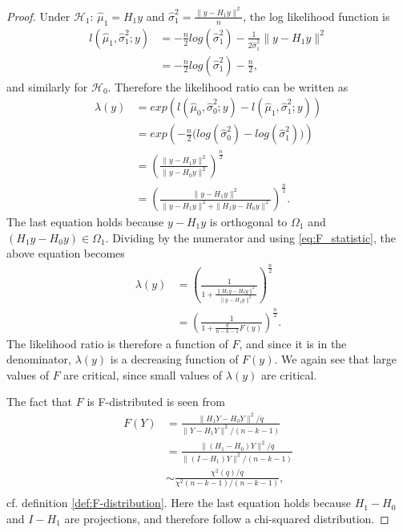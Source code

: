 \begin{proof}
    Under $\mathcal{H}_1$: $\hat{\mu}_1 = H_1 y$ and $\hat{\sigma}_1^2 = \frac{\| y - H_1 y \|^2}{n}$, the log likelihood function is
    \begin{align*}
        l(\hat{\mu}_1, \hat{\sigma}_1^2; y) &= -\frac{n}{2} log(\hat{\sigma}_1^2) - \frac{1}{2 \hat{\sigma}_1^2} \| y - H_1 y \|^2 \\
        &= -\frac{n}{2} log(\hat{\sigma}_1^2) - \frac{n}{2},
    \end{align*}
    and similarly for $\mathcal{H}_0$. Therefore the likelihood ratio can be written as
    \begin{align*}
        \lambda(y) &= exp \left( l(\hat{\mu}_0, \hat{\sigma}_0^2; y) - l(\hat{\mu}_1, \hat{\sigma}_1^2; y) \right) \\
        &= exp \left( -\frac{n}{2} \Big( log(\hat{\sigma}_0^2) - log(\hat{\sigma}_1^2)\Big) \right) \\
        &= \left( \frac{\| y - H_1 y \|^2}{\| y - H_0 y \|^2} \right)^{\frac{n}{2}} \\
        &= \left( \frac{\| y - H_1 y \|^2}{\| y - H_1 y \|^2 + \| H_1 y - H_0 y \|^2} \right)^{\frac{n}{2}}.
    \end{align*}
    The last equation holds because $y - H_1 y$ is orthogonal to $\Omega_1$ and $(H_1 y - H_0 y) \in \Omega_1$. Dividing by the numerator and using \eqref{eq:F_statistic}, the above equation becomes
    \begin{align*}
        \lambda(y) &= \left( \frac{1}{1 + \frac{\| H_1 y - H_0 y \|^2}{\| y - H_1 y \|^2}} \right)^{\frac{n}{2}} \\
        &= \left( \frac{1}{1 + \frac{q}{n-k-1}F(y)}  \right)^{\frac{n}{2}}.
    \end{align*}
    The likelihood ratio is therefore a function of $F$, and since it is in the denominator, $\lambda(y)$ is a decreasing function of $F(y)$. We again see that large values of $F$ are critical, since small values of $\lambda(y)$ are critical.
    
    The fact that $F$ is F-distributed is seen from
    \begin{align*}
        F(Y) &= \frac{\| H_1 Y - H_0 Y \|^2/q}{\| Y - H_1 Y \|^2/(n-k-1)} \\
        &= \frac{\| (H_1 - H_0) Y \|^2/q}{\| (I - H_1) Y \|^2/(n-k-1)} \\
        &\sim \frac{\chi^2(q)/q}{\chi^2(n-k-1)/(n-k-1)}, \\
    \end{align*}
    cf. definition \ref{def:F-distribution}. Here the last equation holds because $H_1 - H_0$ and $I - H_1$ are projections, and therefore follow a chi-squared distribution.
\end{proof}

